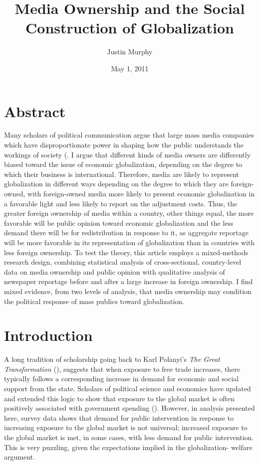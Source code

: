 \documentclass[12pt]{report}
\begin{document}
\title{Media Ownership and the Social Construction of Globalization}
\author{Justin Murphy}
\date{May 1, 2011}


\maketitle

\doublespacing

\section{Abstract}
Many scholars of political communication argue that large mass media companies which have disproportionate power in shaping how the public understands the workings of society (\citealt{Baker:2006te,Bagdikian:1980ci,Ben:1990tw}. I argue that different kinds of media owners are differently biased toward the issue of economic globalization, depending on the degree to which their business is international. Therefore, media are likely to represent globalization in different ways depending on the degree to which they are foreign-owned, with foreign-owned media more likely to present economic globalization in a favorable light and less likely to report on the adjustment costs. Thus, the greater foreign ownership of media within a country, other things equal, the more favorable will be public opinion toward economic globalization and the less demand there will be for redistribution in response to it, as aggregate reportage will be more favorable in its representation of globalization than in countries with less foreign ownership. To test the theory, this article employs a mixed-methods research design, combining statistical analysis of cross-sectional, country-level data on media ownership and public opinion with qualitative analysis of newspaper reportage before and after a large increase in foreign ownership. I find mixed evidence, from two levels of analysis, that media ownership may condition the political response of mass publics toward globalization.

\section{Introduction}

A long tradition of scholarship going back to Karl Polanyi's \emph{The Great Transformation}
(\citeyear{Polanyi:2001vc}), suggests that when exposure to free trade increases, there typically
follows a corresponding increase in demand for economic and social support from the state. Scholars
of political science and economics have updated and extended this logic to show that exposure to the
global market is often positively associated with government spending (\citealt{Adsera:2002vt,
Cameron:1978vb, Garrett:1998wl,Rodrik:1998te}). However, in analysis presented here, survey data
shows that demand for public intervention in response to increasing exposure to the global market is
not universal; increased exposure to the global market is met, in some cases, with less demand for
public intervention. This is very puzzling, given the expectations implied in the globalization-
welfare argument.
\end{document}
